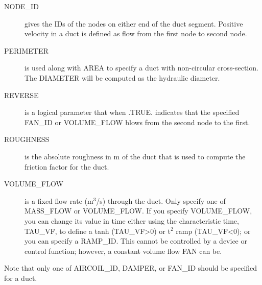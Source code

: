 \documentclass[11pt]{book}
\begin{document}
\begin{description}
\item[{\ct NODE\_ID}] gives the {\ct ID}s of the nodes on either end of the duct segment.  Positive velocity in a duct is defined as flow from the first node to second node.
\item[{\ct PERIMETER}] is used along with {\ct AREA} to specify a duct with non-circular cross-section.  The {\ct DIAMETER} will be computed as the hydraulic diameter.
\item[{\ct REVERSE}]  is a logical parameter that when {\ct .TRUE.} indicates that the specified {\ct FAN\_ID} or {\ct VOLUME\_FLOW} blows from the second node to the first.
\item[{\ct ROUGHNESS}] is the absolute roughness in m of the duct that is used to compute the friction factor for the duct.
\item[{\ct VOLUME\_FLOW}] is a fixed flow rate (m$^3$/s) through the duct.  Only specify one of {\ct MASS\_FLOW} or {\ct VOLUME\_FLOW}. If you specify {\ct VOLUME\_FLOW}, you can change its value in time either using the characteristic time, {\ct TAU\_VF},  to define a tanh ({\ct TAU\_VF}>0) or t$^2$ ramp ({\ct TAU\_VF}<0); or you can specify a {\ct RAMP\_ID}.  This cannot be controlled by a device or control function; however, a constant volume flow {\ct FAN} can be.
\end{description}
Note that only one of {\ct AIRCOIL\_ID}, {\ct DAMPER}, or {\ct FAN\_ID} should be specified for a duct.
\end{document}
